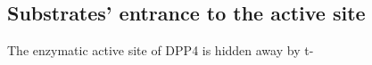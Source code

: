 \subsection{Substrates' entrance to the active site}

The enzymatic active site of DPP4 is hidden away by t\beta-
